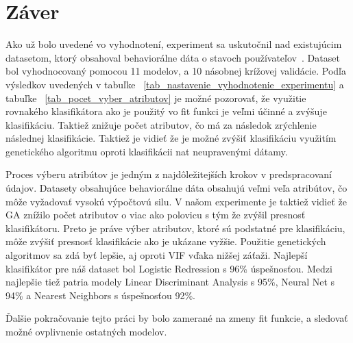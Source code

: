 \documentclass[runningheads]{llncs}
\begin{document}
\section{Záver}


Ako už bolo uvedené vo vyhodnotení, experiment sa uskutočnil nad existujúcim datasetom, 
ktorý obsahoval behaviorálne dáta o stavoch používateľov~\cite{ref_dataset_anguita,ref_dataset}.
Dataset bol vyhodnocovaný pomocou 11 modelov, a 10 násobnej krížovej validácie.
Podľa výsledkov uvedených v tabuľke ~\ref{tab_nastavenie_vyhodnotenie_experimentu} 
a tabuľke ~\ref{tab_pocet_vyber_atributov} je možné pozorovať, že využitie rovnakého klasifikátora
ako je použitý vo fit funkci je veľmi účinné a zvýšuje klasifikáciu. Taktiež znižuje počet atributov,
čo má za následok zrýchlenie následnej klasifikácie. Taktiež je vidieť že je možné zvýšiť klasifikáciu
využitím genetického algoritmu oproti klasifikácii nat neupravenými dátamy. 

Proces výberu atribútov je jedným z najdôležitejších krokov v predspracovaní údajov. Datasety 
obsahujúce behaviorálne dáta obsahujú veľmi veľa atribútov, čo môže vyžadovať vysokú výpočtovú silu. V našom
experimente je taktiež vidieť že GA znížilo počet atributov o viac ako polovicu s tým že zvýšil presnosť klasifikátoru.
Preto je práve výber atributov, ktoré sú podstatné pre klasifikáciu, môže zvýšiť presnosť klasifikácie
ako je ukázane vyžšie. Použitie genetických algoritmov sa zdá byť lepšie, aj oproti VIF vďaka nižšej záťaži.
Najlepší klasifikátor pre náš dataset bol Logistic Redression s 96\% úspešnosťou. Medzi najlepšie tiež patria
modely Linear Discriminant Analysis s 95\%, Neural Net s 94\% a Nearest Neighbors s úspešnosťou 92\%. 

Ďalšie pokračovanie tejto práci by bolo zamerané na zmeny fit funkcie, a sledovať možné ovplivnenie ostatných modelov.
\end{document}
